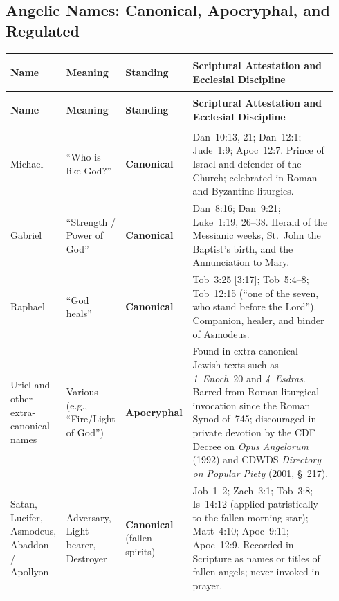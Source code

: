 \subsection{Angelic Names: Canonical, Apocryphal, and Regulated}

{\footnotesize
\setlength{\tabcolsep}{2.5pt}
\renewcommand{\arraystretch}{1.15}
\begin{longtable}{>{\bfseries\raggedright\arraybackslash}p{0.15\linewidth}>{\raggedright\arraybackslash}p{0.15\linewidth}>{\raggedright\arraybackslash}p{0.20\linewidth}>{\raggedright\arraybackslash}p{0.44\linewidth}}
\toprule
\textbf{Name} & \textbf{Meaning} & \textbf{Standing} & \textbf{Scriptural Attestation and Ecclesial Discipline} \\
\midrule
\endfirsthead
\toprule
\textbf{Name} & \textbf{Meaning} & \textbf{Standing} & \textbf{Scriptural Attestation and Ecclesial Discipline} \\
\midrule
\endhead
\bottomrule
\endfoot
Michael & ``Who is like God?'' & \textbf{Canonical} & Dan~10:13, 21; Dan~12:1; Jude~1:9; Apoc~12:7. Prince of Israel and defender of the Church; celebrated in Roman and Byzantine liturgies. \\
\addlinespace[2pt]
Gabriel & ``Strength / Power of God'' & \textbf{Canonical} & Dan~8:16; Dan~9:21; Luke~1:19, 26--38. Herald of the Messianic weeks, St.~John the Baptist's birth, and the Annunciation to Mary. \\
\addlinespace[2pt]
Raphael & ``God heals'' & \textbf{Canonical} & Tob~3:25 [3:17]; Tob~5:4--8; Tob~12:15 (``one of the seven, who stand before the Lord''). Companion, healer, and binder of Asmodeus. \\
\addlinespace[2pt]
Uriel and other extra-canonical names & Various (e.g., ``Fire/Light of God'') & \textbf{Apocryphal} & Found in extra-canonical Jewish texts such as \emph{1~Enoch}~20 and \emph{4~Esdras}. Barred from Roman liturgical invocation since the Roman Synod of~745; discouraged in private devotion by the CDF Decree on \emph{Opus Angelorum} (1992) and CDWDS \emph{Directory on Popular Piety} (2001, \S~217). \\
\addlinespace[2pt]
Satan, Lucifer, Asmodeus, Abaddon / Apollyon & Adversary, Light-bearer, Destroyer & \textbf{Canonical} (fallen spirits) & Job~1--2; Zach~3:1; Tob~3:8; Is~14:12 (applied patristically to the fallen morning star); Matt~4:10; Apoc~9:11; Apoc~12:9. Recorded in Scripture as names or titles of fallen angels; never invoked in prayer. \\
\end{longtable}
}
